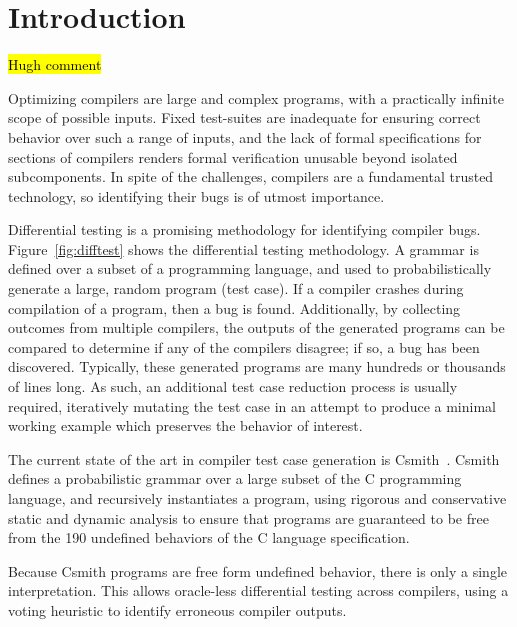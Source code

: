 \section{Introduction}\label{sec:intro}

\hl{Hugh comment}

\noindent
Optimizing compilers are large and complex programs, with a practically infinite scope of possible inputs. Fixed test-suites are inadequate for ensuring correct behavior over such a range of inputs, and the lack of formal specifications for sections of compilers renders formal verification unusable beyond isolated subcomponents. In spite of the challenges, compilers are a fundamental trusted technology, so identifying their bugs is of utmost importance.

Differential testing is a promising methodology for identifying compiler bugs. Figure~\ref{fig:difftest} shows the differential testing methodology. A grammar is defined over a subset of a programming language, and used to probabilistically generate a large, random program (test case). If a compiler crashes during compilation of a program, then a bug is found. Additionally, by collecting outcomes from multiple compilers, the outputs of the generated programs can be compared to determine if any of the compilers disagree; if so, a bug has been discovered. Typically, these generated programs are many hundreds or thousands of lines long. As such, an additional test case reduction process is usually required, iteratively mutating the test case in an attempt to produce a minimal working example which preserves the behavior of interest.

The current state of the art in compiler test case generation is Csmith~\cite{Yang2011}. Csmith defines a probabilistic grammar over a large subset of the C programming language, and recursively instantiates a program, using rigorous and conservative static and dynamic analysis to ensure that programs are guaranteed to be free from the 190 undefined behaviors of the C language specification.

Because Csmith programs are free form undefined behavior, there is only a single interpretation. This allows oracle-less differential testing across compilers, using a voting heuristic to identify erroneous compiler outputs.

